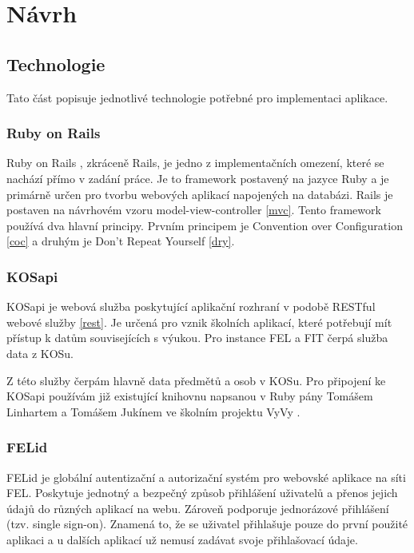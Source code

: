 \chapter{Návrh}

\section{Technologie}
Tato část popisuje jednotlivé technologie potřebné pro implementaci aplikace.

\subsection{Ruby on Rails}
Ruby on Rails \cite{rubyonrails}, zkráceně Rails, je jedno z implementačních omezení, které se nachází přímo v zadání práce. Je to framework postavený na jazyce Ruby \cite{ruby} a je primárně určen pro tvorbu webových aplikací napojených na databázi. Rails je postaven na návrhovém vzoru model-view-controller \ref{mvc}. Tento framework používá dva hlavní principy. Prvním principem je Convention over Configuration \ref{coc} a druhým je Don’t Repeat Yourself \ref{dry}.

\subsection{KOSapi}
\label{kosapi}
KOSapi je webová služba poskytující aplikační rozhraní v podobě RESTful webové služby \ref{rest}. Je určená pro vznik školních aplikací, které potřebují mít přístup k datům souvisejících s výukou. Pro instance FEL a FIT čerpá služba data z KOSu.

Z této služby čerpám hlavně data předmětů a osob v KOSu. Pro připojení ke KOSapi používám již existující knihovnu napsanou v Ruby pány Tomášem Linhartem a Tomášem Jukínem ve školním projektu VyVy \cite{vyvy_project}. 

\subsection{FELid}
\label{felid}
FELid \cite{felid} je globální autentizační a autorizační systém pro webovské aplikace na síti FEL. Poskytuje jednotný a bezpečný způsob přihlášení uživatelů a přenos jejich údajů do různých aplikací na webu. Zároveň podporuje jednorázové přihlášení (tzv. single sign-on). Znamená to, že se uživatel přihlašuje pouze do první použité aplikaci a u dalších aplikací už nemusí zadávat svoje přihlašovací údaje.

